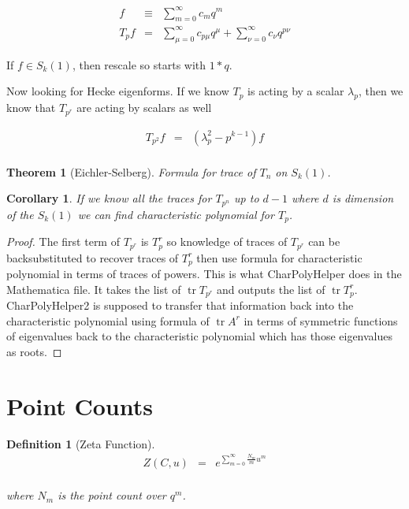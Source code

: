 \documentclass[11pt]{article}
\theoremstyle{change}
\newtheorem{definition}[equation]{Definition}
\newtheorem{theorem}[equation]{Theorem}
\newtheorem{cor}[equation]{Corollary}
\theoremstyle{nonumberplain}
\newtheorem{proof}{Proof}
\numberwithin{equation}{section}
\DeclareMathOperator{\tr}{tr}
\begin{document}
\begin{eqnarray*}
f &\equiv& \sum_{m=0}^\infty c_m q^m\\
T_p f &=& \sum_{\mu=0}^\infty c_{p\mu} q^{\mu} + \sum_{\nu=0}^\infty c_\nu q^{p \nu}
\end{eqnarray*}

If $f \in S_k (1)$, then rescale so starts with $1*q$.

Now looking for Hecke eigenforms. If we know $T_p$ is acting by a scalar $\lambda_p$, then we know that $T_{p^r}$ are acting by scalars as well

\begin{eqnarray*}
T_{p^2} f &=& ( \lambda_p^2 - p^{k-1} )f\\
\end{eqnarray*}

\begin{theorem}[Eichler-Selberg]
Formula for trace of $T_n$ on $S_k (1)$.
\end{theorem}

\begin{cor}
If we know all the traces for $T_{p^n}$ up to $d-1$ where $d$ is dimension of the $S_k (1)$ we can find characteristic polynomial for $T_p$.
\end{cor}

\begin{proof}
The first term of $T_{p^r}$ is $T_p^r$ so knowledge of traces of $T_{p^r}$ can be backsubstituted to recover traces of $T_p^r$ then use formula for characteristic polynomial in terms of traces of powers.
This is what CharPolyHelper does in the Mathematica file. It takes the list of $\tr T_{p^r}$ and outputs the list of $\tr T_p^r$. CharPolyHelper2 is supposed to transfer that information back into the characteristic polynomial using formula of $\tr A^r$ in terms of symmetric functions of eigenvalues back to the characteristic polynomial which has those eigenvalues as roots.
\end{proof}

\section{Point Counts}

\begin{definition}[Zeta Function]
\begin{eqnarray*}
Z (C , u ) &=& e^{\sum_{m=0}^\infty \frac{N_m}{m} u^m}\\
\end{eqnarray*}

where $N_m$ is the point count over $q^m$.
\end{definition}
\end{document}
